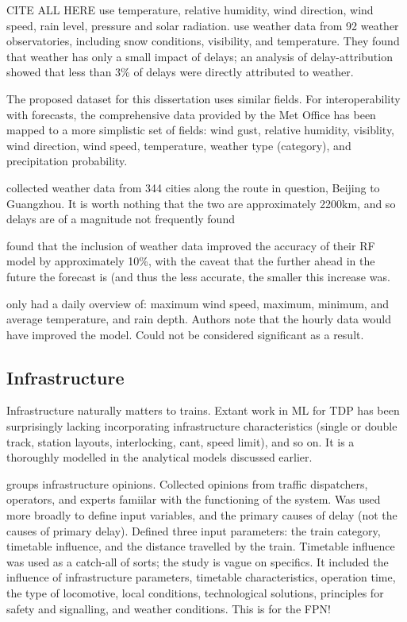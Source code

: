 \documentclass{article}
\begin{document}
 \cite{oneto_et_al_2016} CITE ALL HERE use temperature, relative humidity, wind direction, wind speed, rain level, pressure and solar radiation.
\cite{nair_et_al_2019} use weather data from 92 weather observatories, including snow conditions, visibility, and temperature. They found that weather has only a small impact of delays; an analysis of delay-attribution showed that less than 3\% of delays were directly attributed to weather. 

The proposed dataset for this dissertation uses similar fields. For interoperability with forecasts, the comprehensive data provided by the Met Office has been mapped to a more simplistic set of fields: wind gust, relative humidity, visiblity, wind direction, wind speed, temperature, weather type (category), and precipitation probability. 

\cite{wang_et_al_2018} collected weather data from 344 cities along the route in question, Beijing to Guangzhou. It is worth nothing that the two are approximately 2200km, and so delays are of a magnitude not frequently found

\cite{oneto_et_al_2016} found that the inclusion of weather data improved the accuracy of their RF model by approximately 10\%, with the caveat that the further ahead in the future the forecast is (and thus the less accurate, the smaller this increase was. 

\cite{nabian_et_al_2019} only had a daily overview of: maximum wind speed, maximum, minimum, and average temperature, and rain depth. Authors note that the hourly data would have improved the model. Could not be considered significant as a result. 


\subsection{Infrastructure}

Infrastructure naturally matters to trains. Extant work in ML for TDP has been surprisingly lacking incorporating infrastructure characteristics (single or double track, station layouts, interlocking, cant, speed limit), and so on. It is a thoroughly modelled in the analytical models discussed earlier.

\cite{milinkovic_et_al_2013} groups infrastructure opinions. Collected opinions from traffic dispatchers, operators, and experts famiilar with the functioning of the system. Was used more broadly to define input variables, and the primary causes of delay (not the causes of primary delay). Defined three input parameters: the train category, timetable influence, and the distance travelled by the train. Timetable influence was used as a catch-all of sorts; the study is vague on specifics. It included the influence of infrastructure parameters, timetable characteristics, operation time, the type of locomotive, local conditions, technological solutions, principles for safety and signalling, and weather conditions. This is for the FPN!
\end{document}
